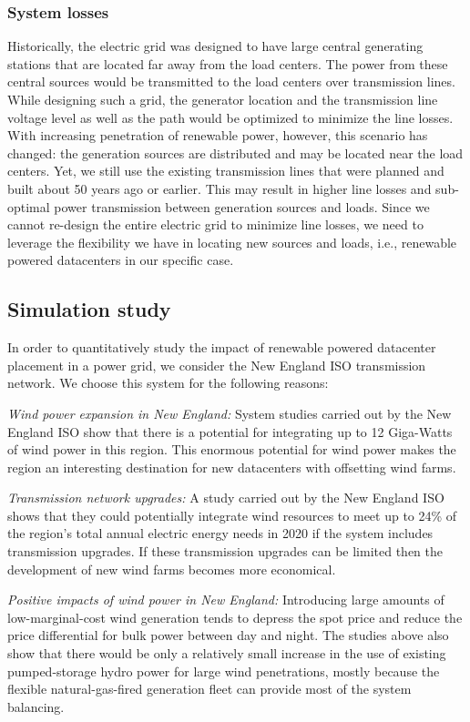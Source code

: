 \subsubsection{System losses}
Historically, the electric grid was designed to have large central
generating stations that are located far away from the load
centers. The power from these central sources would be transmitted to
the load centers over transmission lines. While designing such a grid,
the generator location and the transmission line voltage level as well
as the path would be optimized to minimize the line losses.  With
increasing penetration of renewable power, however, this scenario has
changed: the generation sources are distributed and may be located
near the load centers.  Yet, we still use the existing transmission
lines that were planned and built about 50 years ago or earlier.  This
may result in higher line losses and sub-optimal power transmission
between generation sources and loads. Since we cannot re-design the
entire electric grid to minimize line losses, we need to leverage the
flexibility we have in locating new sources and loads, i.e., renewable
powered datacenters in our specific case.


\subsection{Simulation study}
In order to quantitatively study the impact of renewable powered datacenter placement in a power grid, we consider the New England ISO transmission network. We choose this system for the following reasons:

{\em Wind power expansion in New England:} System studies carried out
by the New England ISO show that there is a potential for integrating
up to 12 Giga-Watts of wind power in this region.  This enormous
potential for wind power makes the region an interesting destination
for new datacenters with offsetting wind farms.

{\em Transmission network upgrades:} A study carried out by the New England ISO shows that they could potentially integrate wind resources to meet up to 24\% of the region's total annual electric energy needs in 2020 if the system includes transmission
upgrades. If these transmission upgrades can be limited then the development of new wind farms becomes more economical.

{\em Positive impacts of wind power in New England:} Introducing
large amounts of low-marginal-cost wind generation tends to depress
the spot price and reduce the price differential for bulk power
between day and night. The studies above also show that there would be
only a relatively small increase in the use of existing pumped-storage
hydro power for large wind penetrations, mostly because the flexible
natural-gas-fired generation fleet can provide most of the system
balancing.

